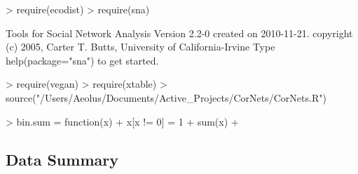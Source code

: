 \documentclass[11pt]{amsart}
\begin{document}
\begin{Schunk}
\begin{Sinput}
> require(ecodist)
> require(sna)
\end{Sinput}
\begin{Soutput}
     Tools for Social Network Analysis
Version      2.2-0 created on      2010-11-21.
copyright (c) 2005, Carter T. Butts, University of California-Irvine
Type help(package="sna") to get started.
\end{Soutput}
\begin{Sinput}
> require(vegan)
> require(xtable)
> source("/Users/Aeolus/Documents/Active_Projects/CorNets/CorNets.R")
\end{Sinput}
\end{Schunk}

\begin{Schunk}
\begin{Sinput}
> bin.sum = function(x) {
+     x[x != 0] = 1
+     sum(x)
+ }
\end{Sinput}
\end{Schunk}

\subsection{Data Summary}
\end{document}
